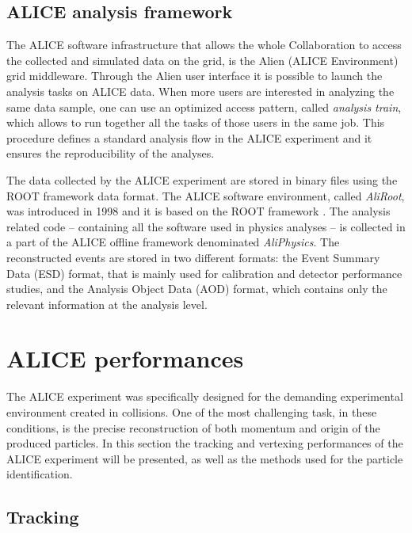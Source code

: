 %
\subsection{ALICE analysis framework} \label{sec:anal_frame}

The ALICE software infrastructure that allows the whole Collaboration to access the collected and
simulated data on the grid, is the Alien (ALICE Environment) \cite{alien} grid middleware.
Through the Alien user interface it is possible to launch the analysis tasks on ALICE data. 
When more users are interested in analyzing the same data sample, one can use an optimized
access pattern, called \textit{analysis train}, which allows to run together all the tasks
of those users in the same job.
This procedure defines a standard analysis flow in the ALICE experiment and it ensures the
reproducibility of the analyses.

The data collected by the ALICE experiment are stored in binary files using the ROOT framework data 
format.
The ALICE software environment, called \textit{AliRoot}, was introduced in 1998 and it is based on 
the ROOT framework \cite{root}.
The analysis related code -- containing all the software used in physics analyses -- is collected
in a part of the ALICE offline framework denominated \textit{AliPhysics}.
The reconstructed events are stored in two different formats: the Event Summary Data (ESD) format, 
that is mainly used for calibration and detector performance studies, and the Analysis Object Data 
(AOD) format, which contains only the relevant information at the analysis level.

%
%
\section{ALICE performances} \label{sec:ali_perf}

The ALICE experiment was specifically designed for the demanding experimental environment created in 
\PbPb collisions. 
One of the most challenging task, in these conditions, is the precise reconstruction of both momentum
and origin of the produced particles.
In this section the tracking and vertexing performances of the ALICE experiment will be presented,
as well as the methods used for the particle identification.

%
\subsection{Tracking} \label{sec:tarcking}

